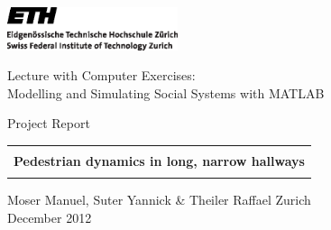 \thispagestyle{empty}

\begin{center}
\includegraphics[width=5cm]{ETHlogo.eps}

\bigskip
\bigskip
\bigskip


\LARGE{ 	Lecture with Computer Exercises:\\ }
\LARGE{ Modelling and Simulating Social Systems with MATLAB\\}

\bigskip
\bigskip

\small{Project Report}\\

\bigskip
\bigskip
\bigskip
\bigskip


\begin{tabular}{|c|}
\hline
\\
\textbf{\LARGE{Pedestrian dynamics in long, narrow hallways}}\\
\\
\hline
\end{tabular}

\bigskip
\bigskip
\bigskip

\LARGE{Moser Manuel, Suter Yannick \& Theiler Raffael}
\vfill
Zurich\\
December 2012\\

\end{center}
